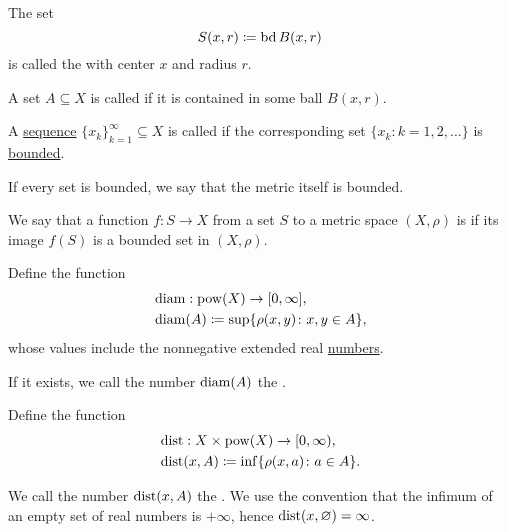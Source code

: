 \begin{definition}
\begin{defenum}
     The set
    \begin{equation*}
      S(x, r) \coloneqq \operatorname{bd}{B(x, r)}
    \end{equation*}
    is called the  with center \( x \) and radius \( r \).

     A set \( A \subseteq X \) is called  if it is contained in some ball \( B(x, r) \).

     A \hyperref[def:sequence]{sequence} \( \{ x_k \}_{k=1}^\infty \subseteq X \) is called  if the corresponding set \( \{ x_k \colon k = 1, 2, \ldots \} \) is \hyperref[def:metric_space/bounded_set]{bounded}.

     If every set is bounded, we say that the metric itself is bounded.

     We say that a function \( f: S \to X \) from a set \( S \) to a metric space \( (X, \rho) \) is  if its image \( f(S) \) is a bounded set in \( (X, \rho) \).

     Define the function
    \begin{align*}
      &\operatorname{diam}: \operatorname{pow}(X) \to [0, \infty], \\
      &\operatorname{diam}(A) \coloneqq \sup \{ \rho(x, y) \colon x, y \in A \},
    \end{align*}
    whose values include the nonnegative extended real \hyperref[def:extended_real_numbers]{numbers}.

    If it exists, we call the number \( \operatorname{diam}(A) \) the .

     Define the function
    \begin{align*}
      &\operatorname{dist}: X \times \operatorname{pow}(X) \to [0, \infty), \\
      &\operatorname{dist}(x, A) \coloneqq \inf \{ \rho(x, a) \colon a \in A \}.
    \end{align*}

    We call the number \( \operatorname{dist}(x, A) \) the . We use the convention that the infimum of an empty set of real numbers is \( +\infty \), hence \( \operatorname{dist}(x, \varnothing) = \infty \).
  \end{defenum}
\end{definition}

